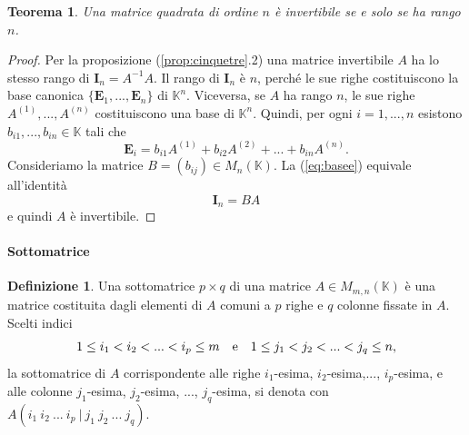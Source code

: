 \documentclass{article}
\theoremstyle{plain}
\newtheorem{thm}{Teorema}[section]
\theoremstyle{definition}
\newtheorem{defn}{Definizione}[section]
\theoremstyle{remark}
\begin{document}
\begin{bxthm}
\begin{thm}\label{prop:cinquequatt}
    Una matrice quadrata di ordine $n$ è invertibile se e solo se ha rango $n$.
\end{thm}
\end{bxthm}
\begin{proof}
    Per la proposizione (\ref{prop:cinquetre}.2) una matrice invertibile $A$ ha lo stesso rango di 
    \(\mathbf{I}_{n}=A^{-1}A\). Il rango di \(\mathbf{I}_{n}\) è $n$, perché le sue righe costituiscono la base canonica
    $\{\mathbf{E}_1, ..., \mathbf{E}_n\}$ di \(\mathbb{K}^{n}\). 
    Viceversa, se $A$ ha rango $n$, le sue righe \(A^{(1)},...,A^{(n)}\) costituiscono una base di $\mathbb{K}^n$. 
    Quindi, per ogni \(i=1,...,n\) esistono \(b_{i1},...,b_{in}\in\mathbb{K}\) tali che
    \begin{equation}\label{eq:basee}
        \mathbf{E}_{i}=b_{i1}A^{(1)}+b_{i2}A^{(2)}+...+b_{in}A^{(n)}.
    \end{equation}
    Consideriamo la matrice \(B=(b_{ij})\in M_{n}(\mathbb{K})\). 
    La (\ref{eq:basee}) equivale all'identità
    \[\mathbf{I}_{n}=BA\]
    e quindi $A$ è invertibile.
\end{proof}

\vspace{10pt}

\paragraph{Sottomatrice}
\begin{bxthm}
\begin{defn}
    Una \textup{sottomatrice} \(p\times q\) di una matrice \(A\in M_{m,n}(\mathbb{K})\) è una matrice costituita dagli elementi 
    di $A$ comuni a $p$ righe e $q$ colonne fissate in $A$. Scelti indici
    \[1\leq i_{1}<i_{2}<...<i_{p}\leq m\quad\textup{e}\quad 1\leq j_{1}<j_{2}<...<j_{q}\leq n,\] 
    la sottomatrice di $A$ corrispondente alle righe $i_{1}$-esima, $i_2$-esima,..., $i_p$-esima, e alle colonne \(j_{1}\)-esima,
    \(j_{2}\)-esima, ..., $j_q$-esima, si denota con \(A(i_{1}\ i_{2}\ ...\ i_{p}\ |\ j_{1}\ j_{2}\ ...\ j_{q})\).
\end{defn}
\end{bxthm}

\vspace{10pt}
\end{document}
